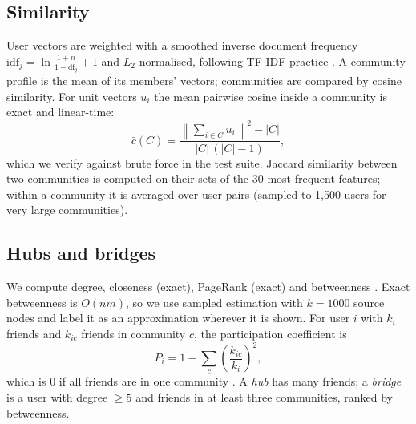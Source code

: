 \documentclass[conference]{IEEEtran}
\begin{document}
\subsection{Similarity}
User vectors are weighted with a smoothed inverse document frequency $\mathrm{idf}_j=\ln\frac{1+n}{1+\mathrm{df}_j}+1$ and $L_2$-normalised, following TF-IDF practice \cite{salton1988}. A community profile is the mean of its members' vectors; communities are compared by cosine similarity. For unit vectors $u_i$ the mean pairwise cosine inside a community is exact and linear-time:
\begin{equation}
\bar{c}(C)=\frac{\left\lVert\sum_{i\in C}u_i\right\rVert^2-|C|}{|C|\,(|C|-1)} ,
\end{equation}
which we verify against brute force in the test suite. Jaccard similarity \cite{jaccard1901} between two communities is computed on their sets of the 30 most frequent features; within a community it is averaged over user pairs (sampled to 1{,}500 users for very large communities).

\subsection{Hubs and bridges}
We compute degree, closeness (exact), PageRank \cite{page1999} (exact) and betweenness \cite{freeman1977}. Exact betweenness is $O(nm)$, so we use sampled estimation \cite{brandes2007} with $k=1000$ source nodes and label it as an approximation wherever it is shown. For user $i$ with $k_i$ friends and $k_{ic}$ friends in community $c$, the participation coefficient is
\begin{equation}
P_i = 1-\sum_c \left(\frac{k_{ic}}{k_i}\right)^2 ,
\end{equation}
which is $0$ if all friends are in one community \cite{guimera2005}. A \emph{hub} has many friends; a \emph{bridge} is a user with degree $\ge 5$ and friends in at least three communities, ranked by betweenness.
\end{document}
